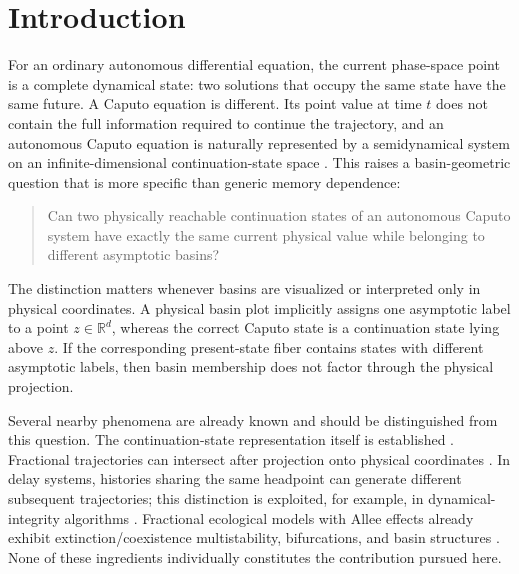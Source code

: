 \section{Introduction}
\label{sec:introduction}

For an ordinary autonomous differential equation, the current phase-space point is a complete dynamical state: two solutions that occupy the same state have the same future.  A Caputo equation is different.  Its point value at time \(t\) does not contain the full information required to continue the trajectory, and an autonomous Caputo equation is naturally represented by a semidynamical system on an infinite-dimensional continuation-state space
\cite{DoanKloeden2021Semidynamical,DoanKloeden2024Attractors}.  This raises a basin-geometric question that is more specific than generic memory dependence:

\begin{quote}
Can two physically reachable continuation states of an autonomous Caputo system have exactly the same current physical value while belonging to different asymptotic basins?
\end{quote}

The distinction matters whenever basins are visualized or interpreted only in physical coordinates.  A physical basin plot implicitly assigns one asymptotic label to a point \(z\in\mathbb{R}^d\), whereas the correct Caputo state is a continuation state lying above \(z\).  If the corresponding present-state fiber contains states with different asymptotic labels, then basin membership does not factor through the physical projection.

Several nearby phenomena are already known and should be distinguished from this question.  The continuation-state representation itself is established
\cite{DoanKloeden2021Semidynamical,DoanKloeden2024Attractors}.  Fractional trajectories can intersect after projection onto physical coordinates
\cite{DeshpandeDaftardarGejjiVellaisamy2019}.  In delay systems, histories sharing the same headpoint can generate different subsequent trajectories; this distinction is exploited, for example, in dynamical-integrity algorithms
\cite{SzakszStepanHabib2024DynamicalIntegrity}.  Fractional ecological models with Allee effects already exhibit extinction/coexistence multistability, bifurcations, and basin structures
\cite{RameshEtAl2025MemoryDoubleAllee,MondalEtAl2025Consequences,WangHan2025Allee,SahaEtAl2026AlleeBasin,PippalSati2026}.  None of these ingredients individually constitutes the contribution pursued here.

